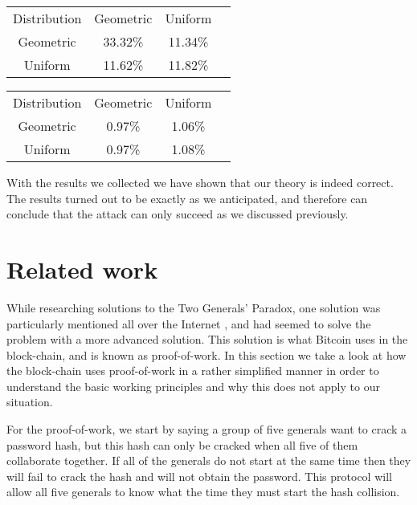 \documentclass[10pt,letterpaper]{article}
\begin{document}
\begin{multicols}{2}
\begin{center}
  \begin{tabular}{ c c c c  }
    \hline
    Distribution & Geometric & Uniform \\
    Geometric & 33.32\% & 11.34\%\\
    Uniform & 11.62\% & 11.82\%\\
    \hline
  \end{tabular}
\end{center}


\begin{center}
\begin{tabular}{ c c c c  }
 \hline
 Distribution & Geometric & Uniform \\
 Geometric & 0.97\% & 1.06\%\\
 Uniform & 0.97\% & 1.08\% \\
 \hline
\end{tabular}
\end{center}

With the results we collected we have shown that our theory is indeed correct. The results turned out to be exactly as we anticipated, and therefore can conclude that the attack can only succeed as we discussed
previously.

\section{Related work}


While researching solutions to the Two Generals' Paradox, one solution was particularly mentioned all over the Internet \cite{miller_laviola}\cite{garay_kiayias_leonardos_2015} , and had seemed to solve the problem with a more advanced solution.
This solution is what Bitcoin uses in the block-chain, and is known as proof-of-work\cite{garay_kiayias_leonardos_2015}. In this section we take a look at how the block-chain uses proof-of-work in a rather simplified manner
in order to understand the basic working principles and why this does not apply to our situation.

For the proof-of-work, we start by saying a group of five generals want to crack a password hash, but this hash can only be cracked when all five of them collaborate together. If all of the
generals do not start at the same time then they will fail to crack the hash and will not obtain the password. This protocol will allow all five generals to know what the time they must start
the hash collision.


\end{multicols}
\end{document}
